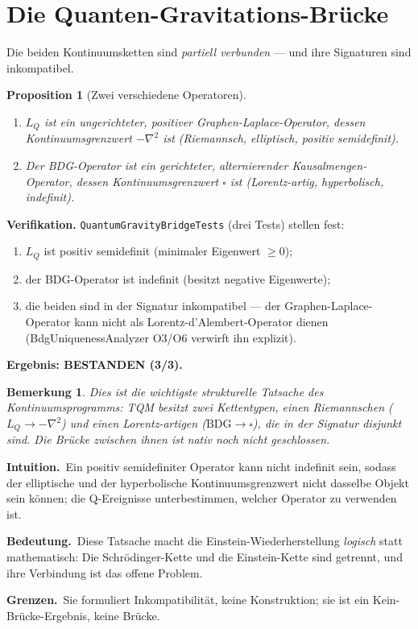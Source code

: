\documentclass[10pt,twoside,openany]{book}
\newtheorem{proposition}[theorem]{Proposition}
\newtheorem{remark}[theorem]{Bemerkung}
\newcommand{\theoremnotes}[3]{%
  \par\medskip\noindent
  \textbf{Intuition.}\ #1\par
  \textbf{Bedeutung.}\ #2\par
  \textbf{Grenzen.}\ #3\par}
\begin{document}
\section{Die Quanten-Gravitations-Brücke}
\label{ch:bridge}

Die beiden Kontinuumsketten sind \emph{partiell verbunden} — und ihre Signaturen sind
inkompatibel.

\begin{proposition}[Zwei verschiedene Operatoren]
\begin{enumerate}
\item $L_Q$ ist ein \emph{ungerichteter, positiver} Graphen-Laplace-Operator, dessen
Kontinuumsgrenzwert $-\nabla^2$ ist (Riemannsch, elliptisch, positiv semidefinit).
\item Der BDG-Operator ist ein \emph{gerichteter, alternierender} Kausalmengen-Operator,
dessen Kontinuumsgrenzwert $\square$ ist (Lorentz-artig, hyperbolisch, indefinit).
\end{enumerate}
\end{proposition}

\textbf{Verifikation.} \texttt{QuantumGravityBridgeTests} (drei Tests) stellen fest:
\begin{enumerate}
\item $L_Q$ ist positiv semidefinit (minimaler Eigenwert $\ge0$);
\item der BDG-Operator ist indefinit (besitzt negative Eigenwerte);
\item die beiden sind in der Signatur inkompatibel — der Graphen-Laplace-Operator kann
nicht als Lorentz-d'Alembert-Operator dienen (BdgUniquenessAnalyzer O3/O6 verwirft ihn
explizit).
\end{enumerate}
\textbf{Ergebnis: BESTANDEN (3/3).}

\begin{remark}
Dies ist die wichtigste strukturelle Tatsache des Kontinuumsprogramms: TQM besitzt
\emph{zwei} Kettentypen, einen Riemannschen ($L_Q\to-\nabla^2$) und einen
Lorentz-artigen ($\mathrm{BDG}\to\square$), die in der Signatur \emph{disjunkt} sind. Die
Brücke zwischen ihnen ist nativ noch nicht geschlossen.
\end{remark}

\theoremnotes
{Ein positiv semidefiniter Operator kann nicht indefinit sein, sodass der elliptische und
der hyperbolische Kontinuumsgrenzwert nicht dasselbe Objekt sein können; die Q-Ereignisse
unterbestimmen, welcher Operator zu verwenden ist.}
{Diese Tatsache macht die Einstein-Wiederherstellung \emph{logisch} statt mathematisch:
Die Schr\"odinger-Kette und die Einstein-Kette sind getrennt, und ihre Verbindung ist das
offene Problem.}
{Sie formuliert Inkompatibilität, keine Konstruktion; sie ist ein Kein-Brücke-Ergebnis,
keine Brücke.}
\end{document}
